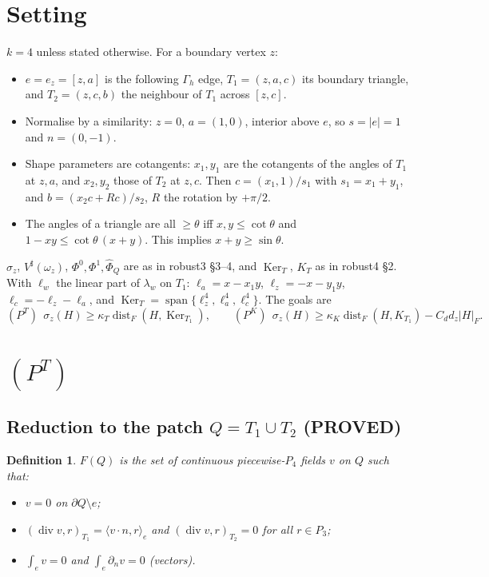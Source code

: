 \documentclass[11pt]{article}
\newtheorem{definition}[theorem]{Definition}
\theoremstyle{remark}
\newcommand{\Gh}{\Gamma_h}
\newcommand{\ip}[2]{\langle #1,#2\rangle}
\begin{document}
\section{Setting}
$k=4$ unless stated otherwise. For a boundary vertex $z$:
\begin{itemize}
\item $e=e_z=[z,a]$ is the following $\Gh$ edge, $T_1=(z,a,c)$ its boundary triangle, and $T_2=(z,c,b)$ the neighbour of $T_1$ across $[z,c]$.
\item Normalise by a similarity: $z=0$, $a=(1,0)$, interior above $e$, so $s=|e|=1$ and $n=(0,-1)$.
\item Shape parameters are cotangents: $x_1,y_1$ are the cotangents of the angles of $T_1$ at $z,a$, and $x_2,y_2$ those of $T_2$ at $z,c$.
 Then $c=(x_1,1)/s_1$ with $s_1=x_1+y_1$, and $b=(x_2c+Rc)/s_2$, $R$ the rotation by $+\pi/2$.
\item The angles of a triangle are all $\ge\theta$ iff $x,y\le\cot\theta$ and $1-xy\le\cot\theta\,(x+y)$. This implies $x+y\ge\sin\theta$.
\end{itemize}
$\sigma_z$, $V^\sharp(\omega_z)$, $\Phi^0,\Phi^1,\hat\Phi_Q$ are as in robust3 \S3--4, and $\operatorname{Ker}_T$, $K_T$ as in robust4 \S2. With
$\ell_w$ the linear part of $\lambda_w$ on $T_1$: $\ell_a=x-x_1y$, $\ell_z=-x-y_1y$, $\ell_c=-\ell_z-\ell_a$, and
$\operatorname{Ker}_T=\operatorname{span}\{\ell_z^4,\ell_a^4,\ell_c^4\}$. The goals are
\[
(P^T)\ \ \sigma_z(H)\ge\kappa_T\operatorname{dist}_F(H,\operatorname{Ker}_{T_1}),\qquad
(P^K)\ \ \sigma_z(H)\ge\kappa_K\operatorname{dist}_F(H,K_{T_1})-C_dd_z|H|_F .
\]

\section{$(P^T)$}
\subsection{Reduction to the patch $Q=T_1\cup T_2$ (PROVED)}
\begin{definition}
$F(Q)$ is the set of continuous piecewise-$P_4$ fields $v$ on $Q$ such that:
\begin{itemize}
\item $v=0$ on $\partial Q\setminus e$;
\item $(\operatorname{div}v,r)_{T_1}=\ip{v\cdot n}{r}_e$ and $(\operatorname{div}v,r)_{T_2}=0$ for all $r\in P_3$;
\item $\int_ev=0$ and $\int_e\partial_nv=0$ (vectors).
\end{itemize}
\end{definition}
\end{document}
